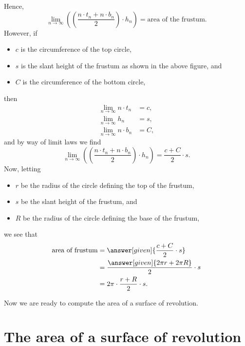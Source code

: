 \documentclass{ximera}
\begin{document}
\begin{theorem}
\begin{explanation}
\begin{image}
    \end{image}
    Hence,
    \[
    \lim_{n\to \infty} \left(\left(\frac{n\cdot t_{n}+n\cdot b_n}{2}\right)\cdot h_n\right) = \text{area of the frustum.}
    \]
    However, if
    \begin{itemize}
    \item $c$ is the circumference of the top circle,
    \item $s$ is the slant height of the frustum as shown in the above
      figure, and 
    \item $C$ is the circumference of the bottom circle,    
    \end{itemize}
    then
    \begin{align*}
      \lim_{n\to \infty} n \cdot t_{n}  &  =c,\\
      \lim_{n\to \infty} h_{n}  &  =s,\\
      \lim_{n\to \infty} n\cdot b_{n}  &  =C,
    \end{align*}
    and by way of limit laws we find
    \[
    \lim_{n\to \infty} \left(\left(\frac{n\cdot t_{n}+n\cdot b_n}{2}\right)\cdot h_n\right) = \frac{c + C}{2}\cdot s.
    \]
    Now, letting
    \begin{itemize}
    \item $r$ be the radius of the circle defining the top of the frustum,
    \item $s$ be the slant height of the frustum, and
    \item $R$ be the radius of the circle defining the base of the frustum,
    \end{itemize}
    we see that
    \begin{align*}
      \text{area of frustum}  &= \answer[given]{\frac{c + C}{2}\cdot s} \\
      &= \frac{\answer[given]{2\pi r + 2\pi R}}{2}\cdot s\\
      &=2\pi \cdot \frac{r+R}{2}\cdot s.
    \end{align*}
  \end{explanation}
\end{theorem}
Now we are ready to compute the area of a surface of revolution.

\section{The area of a surface of revolution}
\end{document}
